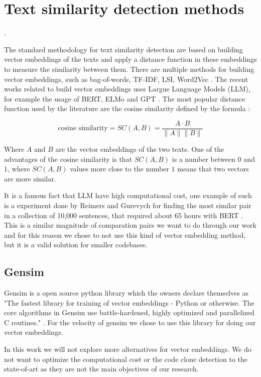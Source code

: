 \en

\section{Text similarity detection methods}
\label{sec:similarity}.

The standard methodology for text similarity detection are based on building vector embeddings of
the texts and apply a distance function in these embeddings to measure the similarity between them. 
There are multiple methods for building vector embeddings, such as bag-of-words, TF-IDF, LSI, Word2Vec \citep{gensimlivro}. 
The recent works related to build vector embeddings uses Largue Language Models (LLM), for example the usage of BERT, ELMo 
and GPT \citep{llmsimilar}. The most popular distance function used by the literature are the cosine similarity 
defined by the formula \citep{cosineref}:

$$\text{cosine similarity} = SC(A,B) = \frac{ A \cdot B}{ \lVert A \rVert \lVert B \rVert }$$


Where $A$ and $B$ are the vector embeddings of the two texts. One of the advantages of the cosine similarity is that $SC(A,B)$ 
is a number between $0$ and $1$, where $SC(A,B)$ values more close to the number $1$ means that two vectors are more similar. 

It is a famous fact that LLM have high computational cost, one example of such is a experiment done by Reimers and Gurevych for 
finding the most similar pair in a collection of 10,000 sentences, that required about 65 hours with BERT \citep{bertsimilar}. This 
is a similar magnitude of comparation pairs we want to do through our work and for this reason we chose to not use this kind of 
vector embedding method, but it is a valid solution for smaller codebases.

\subsection{Gensim}

Gensim is a open source python library \citep{gensim} which the owners declare themselves as "The fastest library 
for training of vector embeddings - Python or otherwise. The core algorithms in Gensim use battle-hardened, 
highly optimized and parallelized C routines." \citep{gensimsite}. For the velocity of gensim we chose to use this library
for doing our vector embeddings. 

In this work we will not explore more alternatives for vector embeddings. We do not want to optimize the computational 
cost or the code clone detection to the state-of-art as they are not the main objectives of our research.


